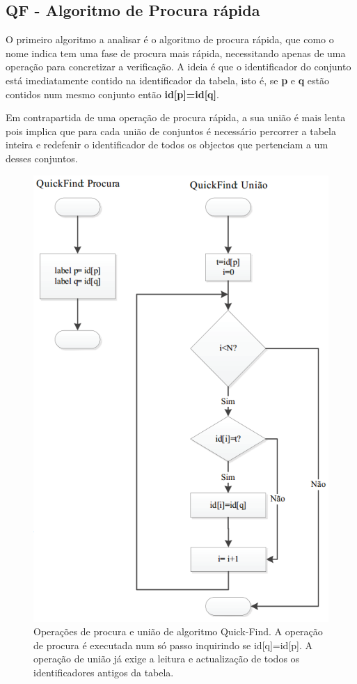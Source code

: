 \documentclass[10pt,a4paper]{article}
\begin{document}
\subsection{QF - Algoritmo de Procura rápida}
\par O primeiro algoritmo a analisar é o algoritmo de procura rápida, que como o nome indica tem uma fase de procura mais rápida, necessitando apenas de uma operação para concretizar a verificação. A ideia é que o identificador do conjunto está imediatamente contido na identificador da tabela, isto é, se \textbf{p} e \textbf{q} estão contidos num mesmo conjunto então \textbf{id[p]=id[q]}.
\par Em contrapartida de uma operação de procura rápida, a sua união é mais lenta pois implica que para cada união de conjuntos é necessário percorrer a tabela inteira e redefenir o identificador de todos os objectos que pertenciam a um desses conjuntos.
\begin{figure}[h!]
\includegraphics[scale=0.5]{flux2.png}
\caption{Operações de procura e união de algoritmo Quick-Find. A operação de procura é executada num só passo inquirindo se id[q]=id[p]. A operação de união já exige a leitura e actualização de todos os identificadores antigos da tabela.}
\end{figure}
\end{document}
